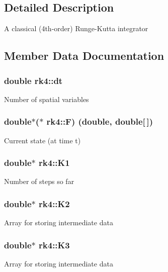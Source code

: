 \subsection{Detailed Description}
A classical (4th-\/order) Runge-\/\+Kutta integrator 

\subsection{Member Data Documentation}
\hypertarget{structrk4_a79622109dfc5eecf546f51828768d70e}{}
\subsubsection[{dt}]{\setlength{\rightskip}{0pt plus 5cm}double rk4\+::dt}\label{structrk4_a79622109dfc5eecf546f51828768d70e}
Number of spatial variables \hypertarget{structrk4_ad7511057d017bdbfb4749504a81a791c}{}
\subsubsection[{F}]{\setlength{\rightskip}{0pt plus 5cm}double$\ast$($\ast$ rk4\+::\+F) (double, double\mbox{[}$\,$\mbox{]})}\label{structrk4_ad7511057d017bdbfb4749504a81a791c}
Current state (at time t) \hypertarget{structrk4_ae34ed14cd80bff2057d6c608e8ee9073}{}
\subsubsection[{K1}]{\setlength{\rightskip}{0pt plus 5cm}double$\ast$ rk4\+::\+K1}\label{structrk4_ae34ed14cd80bff2057d6c608e8ee9073}
Number of steps so far \hypertarget{structrk4_a0a27f914e752daa876b07c31afa6babf}{}
\subsubsection[{K2}]{\setlength{\rightskip}{0pt plus 5cm}double$\ast$ rk4\+::\+K2}\label{structrk4_a0a27f914e752daa876b07c31afa6babf}
Array for storing intermediate data \hypertarget{structrk4_aa0a71aaaedac1ab7b3e03be4604e1845}{}
\subsubsection[{K3}]{\setlength{\rightskip}{0pt plus 5cm}double$\ast$ rk4\+::\+K3}\label{structrk4_aa0a71aaaedac1ab7b3e03be4604e1845}
Array for storing intermediate data \hypertarget{structrk4_af94017f53b4c629e055a14f8c48572dd}{}
